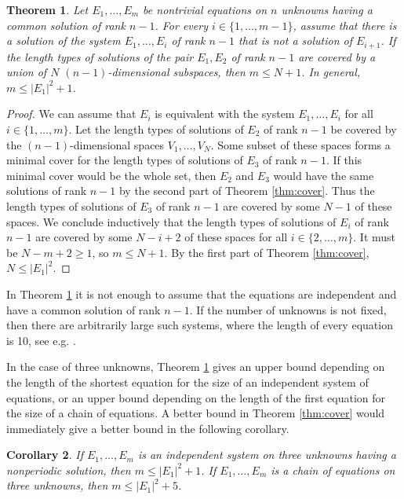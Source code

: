 \documentclass[submission]{eptcs}
\newtheorem{theorem}{Theorem}[section]
\newtheorem{corollary}[theorem]{Corollary}
\theoremstyle{definition}
\begin{document}
\begin{theorem} \label{thm:chain}
Let $E_1, \dots, E_m$ be nontrivial equations on $n$ unknowns having
a common solution of rank $n-1$. For every $i \in \{1, \dots,
m-1\}$, assume that there is a solution of the system $E_1, \dots,
E_i$ of rank $n-1$ that is not a solution of $E_{i+1}$. If the
length types of solutions of the pair $E_1, E_2$ of rank $n-1$ are
covered by a union of $N$ $(n-1)$-dimensional subspaces, then $m
\leq N + 1$. In general, $m \leq |E_1|^2 + 1$.
\end{theorem}
\begin{proof}
We can assume that $E_i$ is equivalent with the system $E_1, \dots,
E_i$ for all $i \in \{1, \dots, m\}$. Let the length types of
solutions of $E_2$ of rank $n-1$ be covered by the
$(n-1)$-dimensional spaces $V_1, \dots, V_N$. Some subset of these
spaces forms a minimal cover for the length types of solutions of
$E_3$ of rank $n-1$. If this minimal cover would be the whole set,
then $E_2$ and $E_3$ would have the same solutions of rank $n-1$ by
the second part of Theorem \ref{thm:cover}. Thus the length types of
solutions of $E_3$ of rank $n-1$ are covered by some $N-1$ of these
spaces. We conclude inductively that the length types of solutions
of $E_i$ of rank $n-1$ are covered by some $N-i+2$ of these spaces
for all $i \in \{2, \dots, m\}$. It must be $N-m+2 \geq 1$, so $m
\leq N + 1$. By the first part of Theorem \ref{thm:cover}, $N \leq
|E_1|^2$.
\end{proof}

In Theorem \ref{thm:chain} it is not enough to assume that the
equations are independent and have a common solution of rank $n-1$.
If the number of unknowns is not fixed, then there are arbitrarily
large such systems, where the length of every equation is 10, see
e.g. \cite{HaKaPl02}.

In the case of three unknowns, Theorem \ref{thm:chain} gives an
upper bound depending on the length of the shortest equation for the
size of an independent system of equations, or an upper bound
depending on the length of the first equation for the size of a
chain of equations. A better bound in Theorem \ref{thm:cover} would
immediately give a better bound in the following corollary.

\begin{corollary}
If $E_1, \dots, E_m$ is an independent system on three unknowns
having a nonperiodic solution, then $m \leq |E_1|^2 + 1$. If $E_1,
\dots, E_m$ is a chain of equations on three unknowns, then $m \leq
|E_1|^2 + 5$.
\end{corollary}



\end{document}

